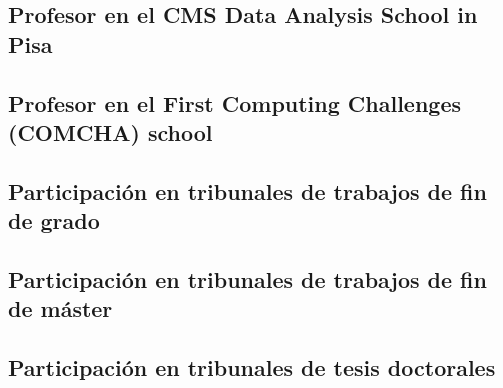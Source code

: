 \documentclass[a4paper, 11pt, twoside, openright]{report}
\begin{document}
\subsection{Profesor en el CMS Data Analysis School in Pisa}


\subsection{Profesor en el First Computing Challenges (COMCHA) school}


\subsection{Participación en tribunales de trabajos de fin de grado}


\subsection{Participación en tribunales de trabajos de fin de máster}


\subsection{Participación en tribunales de tesis doctorales}

\end{document}
